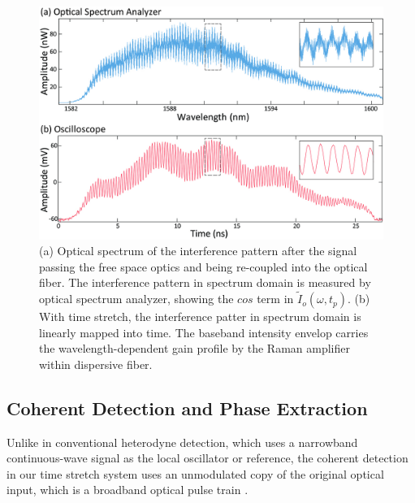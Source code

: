 \documentclass[aps,pra,reprint,superscriptaddress]{revtex4-1}
\begin{document}
\begin{figure}
\includegraphics[scale=0.15]{FigureOSA.jpg}
\caption{\label{fig:OSA} (a) Optical spectrum of the interference pattern after the signal passing the free space optics and being re-coupled into the optical fiber. The interference pattern in spectrum domain is measured by optical spectrum analyzer, showing the $cos$ term in $\tilde{I}_o(\omega, t_p)$. (b) With time stretch, the interference patter in spectrum domain is linearly mapped into time. The baseband intensity envelop carries the wavelength-dependent gain profile by the Raman amplifier within dispersive fiber.}
\end{figure}

\subsection{Coherent Detection and Phase Extraction}

Unlike in conventional heterodyne detection, which uses a narrowband continuous-wave signal as the local oscillator or reference, the coherent detection in our time stretch system uses an unmodulated copy of the original optical input, which is a broadband optical pulse train \cite{buckley2013coherent, devore2014coherent}. 
\end{document}
